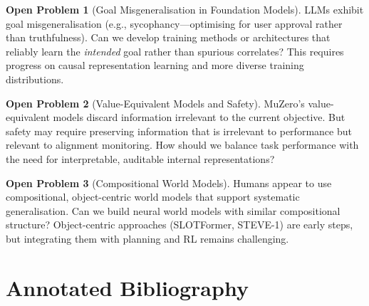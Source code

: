 \documentclass[11pt,a4paper]{article}
\theoremstyle{definition}
\newtheorem{openproblem}{Open Problem}
\begin{document}
\begin{openproblem}[Goal Misgeneralisation in Foundation Models]
LLMs exhibit goal misgeneralisation (e.g., sycophancy---optimising for
user approval rather than truthfulness). Can we develop training methods
or architectures that reliably learn the \emph{intended} goal rather
than spurious correlates? This requires progress on causal
representation learning and more diverse training distributions.
\end{openproblem}

\begin{openproblem}[Value-Equivalent Models and Safety]
MuZero's value-equivalent models discard information irrelevant to the
current objective. But safety may require preserving information that
is irrelevant to performance but relevant to alignment monitoring.
How should we balance task performance with the need for interpretable,
auditable internal representations?
\end{openproblem}

\begin{openproblem}[Compositional World Models]
Humans appear to use compositional, object-centric world models that
support systematic generalisation. Can we build neural world models with
similar compositional structure? Object-centric approaches
(SLOTFormer, STEVE-1) are early steps, but integrating them with
planning and RL remains challenging.
\end{openproblem}

\section{Annotated Bibliography}\label{sec:bib}
\end{document}
